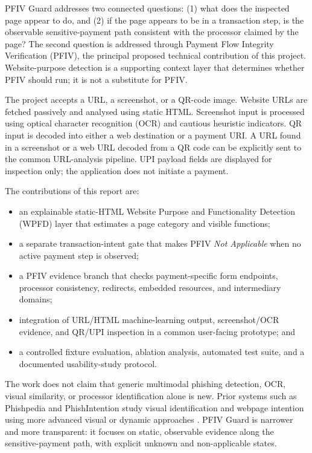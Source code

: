 \documentclass[conference]{IEEEtran}
\begin{document}
PFIV Guard addresses two connected questions: (1) what does the inspected page appear to do, and (2) if the page appears to be in a transaction step, is the observable sensitive-payment path consistent with the processor claimed by the page? The second question is addressed through Payment Flow Integrity Verification (PFIV), the principal proposed technical contribution of this project. Website-purpose detection is a supporting context layer that determines whether PFIV should run; it is not a substitute for PFIV.

The project accepts a URL, a screenshot, or a QR-code image. Website URLs are fetched passively and analysed using static HTML. Screenshot input is processed using optical character recognition (OCR) and cautious heuristic indicators. QR input is decoded into either a web destination or a payment URI. A URL found in a screenshot or a web URL decoded from a QR code can be explicitly sent to the common URL-analysis pipeline. UPI payload fields are displayed for inspection only; the application does not initiate a payment.

The contributions of this report are:
\begin{itemize}[leftmargin=*]
    \item an explainable static-HTML Website Purpose and Functionality Detection (WPFD) layer that estimates a page category and visible functions;
    \item a separate transaction-intent gate that makes PFIV \emph{Not Applicable} when no active payment step is observed;
    \item a PFIV evidence branch that checks payment-specific form endpoints, processor consistency, redirects, embedded resources, and intermediary domains;
    \item integration of URL/HTML machine-learning output, screenshot/OCR evidence, and QR/UPI inspection in a common user-facing prototype; and
    \item a controlled fixture evaluation, ablation analysis, automated test suite, and a documented usability-study protocol.
\end{itemize}

The work does not claim that generic multimodal phishing detection, OCR, visual similarity, or processor identification alone is new. Prior systems such as Phishpedia and PhishIntention study visual identification and webpage intention using more advanced visual or dynamic approaches \cite{phishpedia,phishintention}. PFIV Guard is narrower and more transparent: it focuses on static, observable evidence along the sensitive-payment path, with explicit unknown and non-applicable states.
\end{document}
